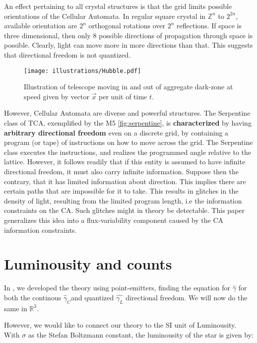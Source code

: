 \documentclass[notitlepage]{article}
\begin{document}
An effect pertaining to all crystal structures is that the grid limits possible orientations of the Cellular Automata. In regular square crystal in $\mathbb{Z}^n$ to $2^{2n}$, available orientation are $2^n$ orthogonal rotations over  $2^n$ reflections. If space is three dimensional, then only 8 possible directions of propagation through space is possible. Clearly, light can move more in more directions than that. This suggests that directional freedom is not quantized. 

\begin{figure}
\centering
{\texttt{[image: illustrations/Hubble.pdf]}}
\caption{Illustration of telescope moving in and out of aggregate dark-zone at speed given by vector $\vec{x} $ per unit of time $t$.  }\label{hubbleDarkZone}
\end{figure}

However, Cellular Automata are diverse and powerful structures. The Serpentine class of TCA, exemplified by the M5 \ref{fig:serpentine}, is \textbf{characterized} by having \textbf{arbitrary directional freedom }even on a discrete grid, by containing a program (or tape) of instructions on how to move across the grid. The Serpentine class executes the instructions, and realizes the programmed angle relative to the lattice. However, it follows readily that if this entity is assumed to have infinite directional freedom, it must also carry infinite information. Suppose then the contrary, that it has limited information about direction. This implies there are certain paths that are impossible for it to take. This results in glitches in the density of light, resulting from the limited program length, i.e the information constraints on the CA. Such glitches might in theory be detectable. This paper generalizes this idea into a flux-variability component caused by the CA information constraints.


\section{Luminousity and counts}
In \cite{RhadamantysA2}, we developed the theory using point-emitters, finding  the equation for $\hat{\gamma}$ for both the continous $\hat{\gamma}_C$and quantized $\hat{\gamma_L}$ directional freedom. We will now do the same in $\mathbb{R}^3$. 

However, we would like to connect our theory to the SI unit  of Luminousity. With $\sigma $ as the Stefan Boltzmann constant, the luminousity of the star is given by:
\end{document}
